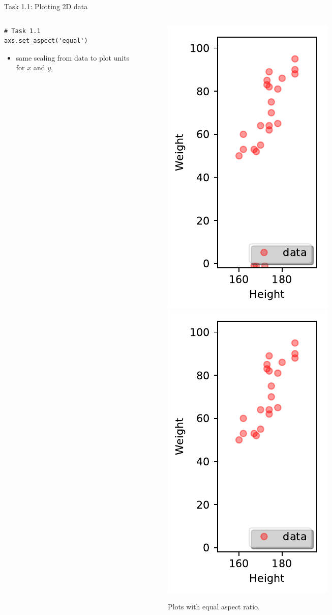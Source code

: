 \documentclass{beamer}
\begin{document}
\begin{frame}[fragile]{Task 1.1: Plotting 2D data}

\begin{columns}
\begin{column}{0.35\textwidth}
	\hspace{1cm}
\begin{lstlisting}[linewidth=5.0cm]
# Task 1.1
axs.set_aspect('equal')
\end{lstlisting}
\begin{itemize}
	\item same scaling from data to plot units for $x$ and $y$,
\end{itemize}
\end{column}


\begin{column}{0.65\textwidth}  
\begin{figure}
	\centering
	\includegraphics[width=.3\textwidth]{images/plotHW_equal_aspect_ratio_outl.pdf}\quad
	\includegraphics[width=.3\textwidth]{images/plotHW_equal_aspect_ratio.pdf}
	\caption{Plots with equal aspect ratio.}
\end{figure}
\end{column}
\end{columns}

\end{frame}
\end{document}
